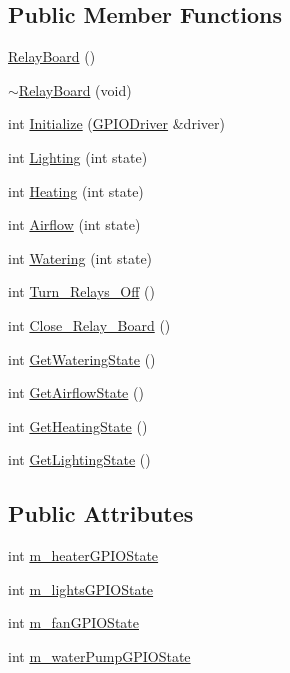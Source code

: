 \subsection*{Public Member Functions}
\begin{DoxyCompactItemize}
\item 
\hyperlink{classRelayBoard_ad96963754490cea54db92cf32ccccf90}{Relay\+Board} ()
\item 
\hyperlink{classRelayBoard_af05bb34a287c76312104a427c86c658e}{$\sim$\+Relay\+Board} (void)
\item 
int \hyperlink{classRelayBoard_aee18a60a8063ebc87331cbb8fbb1a42f}{Initialize} (\hyperlink{classGPIODriver}{G\+P\+I\+O\+Driver} \&driver)
\item 
int \hyperlink{classRelayBoard_a0ce37124540bae0827a1b81e28841f70}{Lighting} (int state)
\item 
int \hyperlink{classRelayBoard_abdfd142dd723bda5fb961f2b83e04d98}{Heating} (int state)
\item 
int \hyperlink{classRelayBoard_aa14251b65f8b4872cdf95c56951f0959}{Airflow} (int state)
\item 
int \hyperlink{classRelayBoard_ab9e7c87d94483e55053722ff0981ff8f}{Watering} (int state)
\item 
int \hyperlink{classRelayBoard_a2339920ca78f22d9bbab349056ca261a}{Turn\+\_\+\+Relays\+\_\+\+Off} ()
\item 
int \hyperlink{classRelayBoard_a8d4fba9b90f8a65a0f02ad9d5a35c148}{Close\+\_\+\+Relay\+\_\+\+Board} ()
\item 
int \hyperlink{classRelayBoard_a2f9f8154a49a9d8ed3b7c54c39a5ed65}{Get\+Watering\+State} ()
\item 
int \hyperlink{classRelayBoard_a4b5cecaeadec360c688868a230a7d3a8}{Get\+Airflow\+State} ()
\item 
int \hyperlink{classRelayBoard_a4725ac8db57d591dbe338f646cdda254}{Get\+Heating\+State} ()
\item 
int \hyperlink{classRelayBoard_a32270d45de9d23698cf85fd3224f88c6}{Get\+Lighting\+State} ()
\end{DoxyCompactItemize}
\subsection*{Public Attributes}
\begin{DoxyCompactItemize}
\item 
int \hyperlink{classRelayBoard_acda1026ec1a4a11016812efc2e7fe732}{m\+\_\+heater\+G\+P\+I\+O\+State}
\item 
int \hyperlink{classRelayBoard_aff19bd04e757a2442243d9f863b435ae}{m\+\_\+lights\+G\+P\+I\+O\+State}
\item 
int \hyperlink{classRelayBoard_a1522a4a160fe47ecd96adf81ba372c98}{m\+\_\+fan\+G\+P\+I\+O\+State}
\item 
int \hyperlink{classRelayBoard_acf0292f25a47eb8facbec7279c0fa69d}{m\+\_\+water\+Pump\+G\+P\+I\+O\+State}
\end{DoxyCompactItemize}
